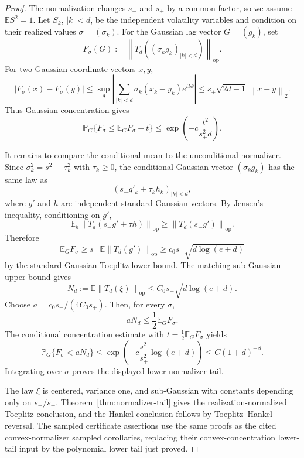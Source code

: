 \documentclass[11pt]{amsart}
\numberwithin{equation}{section}
\theoremstyle{definition}
\theoremstyle{remark}
\newcommand{\op}{\mathrm{op}}
\newcommand{\Prob}{\mathbb P}
\newcommand{\Exp}{\mathbb E}
\newcommand{\norm}[1]{\left\lVert #1\right\rVert}
\begin{document}
\begin{proof}
The normalization changes \(s_-\) and \(s_+\) by a common factor, so we assume
\(\Exp S^2=1\).  Let \(S_k\), \(|k|<d\), be the independent volatility variables
and condition on their realized values \(\sigma=(\sigma_k)\).  For the Gaussian
lag vector \(G=(g_k)\), set
\[
  F_\sigma(G):=\norm{T_d((\sigma_kg_k)_{|k|<d})}_{\op}.
\]
For two Gaussian-coordinate vectors \(x,y\),
\[
  |F_\sigma(x)-F_\sigma(y)|
  \le \sup_\theta\left|\sum_{|k|<d}\sigma_k(x_k-y_k)e^{ik\theta}\right|
  \le s_+\sqrt{2d-1}\,\norm{x-y}_2 .
\]
Thus Gaussian concentration gives
\[
  \Prob_G\{F_\sigma\le \Exp_G F_\sigma-t\}
  \le \exp\left(-c\frac{t^2}{s_+^2d}\right).
\]

It remains to compare the conditional mean to the unconditional normalizer.
Since \(\sigma_k^2=s_-^2+\tau_k^2\) with \(\tau_k\ge0\), the conditional
Gaussian vector \((\sigma_kg_k)\) has the same law as
\[
  (s_-g'_k+\tau_k h_k)_{|k|<d},
\]
where \(g'\) and \(h\) are independent standard Gaussian vectors.  By Jensen's
inequality, conditioning on \(g'\),
\[
  \Exp_h\norm{T_d(s_-g'+\tau h)}_{\op}
  \ge \norm{T_d(s_-g')}_{\op}.
\]
Therefore
\[
  \Exp_G F_\sigma\ge s_-\,\Exp\norm{T_d(g')}_{\op}
  \ge c_0s_-\sqrt{d\log(e+d)}
\]
by the standard Gaussian Toeplitz lower bound.  The matching sub-Gaussian upper
bound gives
\[
  N_d:=\Exp\norm{T_d(\xi)}_{\op}
  \le C_0s_+\sqrt{d\log(e+d)} .
\]
Choose \(a=c_0s_-/(4C_0s_+)\).  Then, for every \(\sigma\),
\[
  aN_d\le \frac12\Exp_G F_\sigma .
\]
The conditional concentration estimate with
\(t=\frac12\Exp_G F_\sigma\) yields
\[
  \Prob_G\{F_\sigma<aN_d\}
  \le \exp\left(-c\frac{s_-^2}{s_+^2}\log(e+d)\right)
  \le C(1+d)^{-\beta}.
\]
Integrating over \(\sigma\) proves the displayed lower-normalizer tail.

The law \(\xi\) is centered, variance one, and sub-Gaussian with constants
depending only on \(s_+/s_-\).  Theorem~\ref{thm:normalizer-tail} gives the
realization-normalized Toeplitz conclusion, and the Hankel conclusion follows
by Toeplitz--Hankel reversal.  The sampled certificate assertions use the same
proofs as the cited convex-normalizer sampled corollaries, replacing their
convex-concentration lower-tail input by the polynomial lower tail just proved.
\end{proof}
\end{document}

